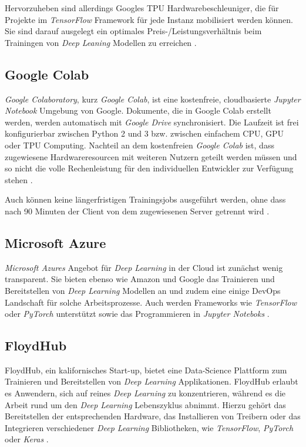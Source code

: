 Hervorzuheben sind allerdings Googles TPU Hardwarebeschleuniger, die für Projekte im \textit{TensorFlow} Framework für jede Instanz mobilisiert werden können. Sie sind darauf ausgelegt ein optimales Preis-/Leistungsverhältnis beim Trainingen von \textit{Deep Leaning} Modellen zu erreichen \cite{GoogleCloudPlatform.20200314}.

\subsection*{Google Colab}

\textit{Google Colaboratory}, kurz \textit{Google Colab}, ist eine kostenfreie, cloudbasierte \textit{Jupyter Notebook} Umgebung von Google. Dokumente, die in Google Colab erstellt werden, werden automatisch mit \textit{Google Drive} synchronisiert. Die Laufzeit ist frei konfigurierbar zwischen Python 2 und 3 bzw. zwischen einfachem CPU, GPU oder TPU Computing. Nachteil an dem kostenfreien \textit{Google Colab} ist, dass zugewiesene Hardwareresourcen mit weiteren Nutzern geteilt werden müssen und so nicht die volle Rechenleistung für den individuellen Entwickler zur Verfügung stehen \cite{GoogleColaboratory.20200314}. 

Auch können keine längerfristigen Trainingsjobs ausgeführt werden, ohne dass nach 90 Minuten der Client von dem zugewiesenen Server getrennt wird \cite{GoogleCloud.20200314}.

\subsection*{Microsoft Azure}

\textit{Microsoft Azures} Angebot für \textit{Deep Learning} in der Cloud ist zunächst wenig transparent. Sie bieten ebenso wie Amazon und Google das Trainieren und Bereitstellen von \textit{Deep Learning} Modellen an und zudem eine einige DevOps Landschaft für solche Arbeitsprozesse. Auch werden Frameworks wie \textit{TensorFlow} oder \textit{PyTorch} unterstützt sowie das Programmieren in \textit{Jupyter Noteboks} \cite{MicrosoftAzure.20200314}.

\subsection*{FloydHub}

FloydHub, ein kalifornisches Start-up, bietet eine Data-Science Plattform zum Trainieren und Bereitstellen von \textit{Deep Learning} Applikationen. FloydHub erlaubt es Anwendern, sich auf reines \textit{Deep Learning} zu konzentrieren, während es die Arbeit rund um den \textit{Deep Learning} Lebenszyklus abnimmt. Hierzu gehört das Bereitstellen der entsprechenden Hardware, das Installieren von Treibern oder das Integrieren verschiedener \textit{Deep Learning} Bibliotheken, wie \textit{TensorFlow}, \textit{PyTorch} oder \textit{Keras} \cite{FloydHub.20200215}. 

